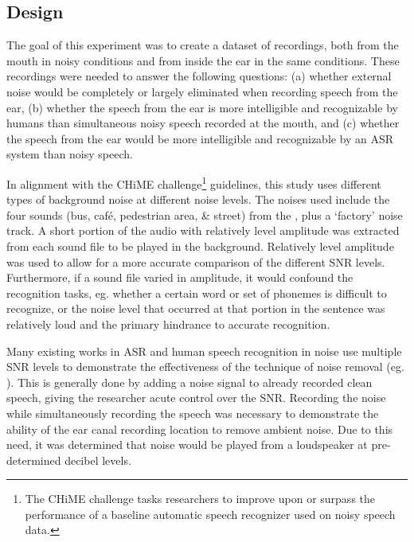 \subsection{Design}
\label{chap2:methods:design}
   
The goal of this experiment was to create a dataset of recordings, both from the mouth in noisy conditions and from inside the ear in the same conditions.  These recordings were needed to answer the following questions: (a) whether external noise would be completely or largely eliminated when recording speech from the ear, (b) whether the speech from the ear is more intelligible and recognizable by humans than simultaneous noisy speech recorded at the mouth, and (c) whether the speech from the ear would be more intelligible and recognizable by an ASR system than noisy speech. 

In alignment with the CHiME challenge\footnote{The CHiME challenge tasks researchers to improve upon or surpass the performance of a baseline automatic speech recognizer used on noisy speech data.} guidelines, this study uses different types of background noise at different noise levels.  The noises used include the four sounds (bus, caf\'{e}, pedestrian area, \& street) from the \cite{chime:16}, plus a `factory' noise track.  A short portion of the audio with relatively level amplitude was extracted from each sound file to be played in the background.  Relatively level amplitude was used to allow for a more accurate comparison of the different SNR levels. Furthermore, if a sound file varied in amplitude, it would confound the recognition tasks, eg. whether a certain word or set of phonemes is difficult to recognize, or the noise level that occurred at that portion in the sentence was relatively loud and the primary hindrance to accurate recognition.

Many existing works in ASR and human speech recognition in noise use multiple SNR levels to demonstrate the effectiveness of the technique of noise removal (eg. \cite{braun:16}).  This is generally done by adding a noise signal to already recorded clean speech, giving the researcher acute control over the SNR.  Recording the noise while simultaneously recording the speech was necessary to demonstrate the ability of the ear canal recording location to remove ambient noise.  Due to this need, it was determined that noise would be played from a loudspeaker at pre-determined decibel levels.  

